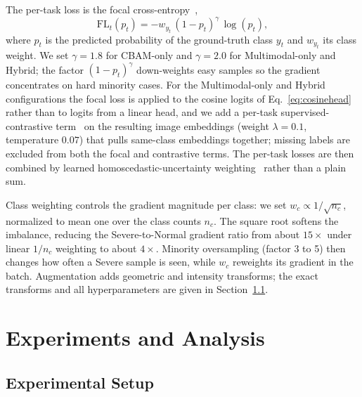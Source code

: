 \documentclass[runningheads]{llncs}
\begin{document}
The per-task loss is the focal cross-entropy~\cite{lin2017focal},
\begin{equation}
\mathrm{FL}_t(p_t) = -w_{y_t}\,(1 - p_t)^{\gamma}\, \log(p_t),
\label{eq:focal}
\end{equation}
where $p_t$ is the predicted probability of the ground-truth class $y_t$ and $w_{y_t}$ its class weight. We set $\gamma=1.8$ for CBAM-only and $\gamma=2.0$ for Multimodal-only and Hybrid; the factor $(1 - p_t)^{\gamma}$ down-weights easy samples so the gradient concentrates on hard minority cases. For the Multimodal-only and Hybrid configurations the focal loss is applied to the cosine logits of Eq.~\ref{eq:cosinehead} rather than to logits from a linear head, and we add a per-task supervised-contrastive term~\cite{khosla2020supcon} on the resulting image embeddings (weight $\lambda=0.1$, temperature $0.07$) that pulls same-class embeddings together; missing labels are excluded from both the focal and contrastive terms. The per-task losses are then combined by learned homoscedastic-uncertainty weighting~\cite{kendall2018multitask} rather than a plain sum.

Class weighting controls the gradient magnitude per class: we set $w_c \propto 1/\sqrt{n_c}$, normalized to mean one over the class counts $n_c$. The square root softens the imbalance, reducing the Severe-to-Normal gradient ratio from about $15\times$ under linear $1/n_c$ weighting to about $4\times$. Minority oversampling (factor 3 to 5) then changes how often a Severe sample is seen, while $w_c$ reweights its gradient in the batch. Augmentation adds geometric and intensity transforms; the exact transforms and all hyperparameters are given in Section~\ref{exp1}.

\section{Experiments and Analysis}\label{sec4}

\subsection{Experimental Setup}\label{exp1}
\end{document}
